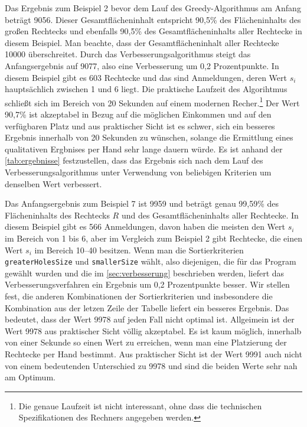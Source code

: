 Das Ergebnis zum Beispiel 2 bevor dem Lauf des Greedy-Algorithmus am Anfang 
beträgt 9056. Dieser Gesamtflächeninhalt entspricht 90,5\% des Flächeninhalts des
großen Rechtecks und ebenfalls 90,5\% des Gesamtflächeninhalts aller Rechtecke in diesem Beispiel.
Man beachte, dass der Gesamtflächeninhalt aller Rechtecke 10000 überschreitet.
Durch das Verbesserungsalgorithmus steigt das Anfangsergebnis auf 9077,
also eine Verbesserung um 0,2 Prozentpunkte.
In diesem Beispiel gibt es 603 Rechtecke und das sind Anmeldungen, deren Wert $s_i$ hauptsächlich zwischen 
1 und 6 liegt. Die praktische Laufzeit des Algorihtmus schließt sich im Bereich von 20 Sekunden
auf einem modernen Recher.\footnote{Die genaue Laufzeit ist nicht interessant, ohne dass die 
technischen Spezifikationen des Rechners angegeben werden.}
Der Wert 90,7\% ist akzeptabel in Bezug auf die möglichen Einkommen und auf den verfügbaren Platz
und aus praktischer Sicht ist es schwer, sich ein besseres Ergebnis innerhalb von 20 Sekunden zu wünschen,
solange die Ermittlung eines qualitativen Ergbnises per Hand sehr lange dauern würde.
Es ist anhand der \cref{tab:ergebnisse} festzustellen, dass das Ergebnis sich nach dem Lauf des
Verbesserungsalgorithmus unter Verwendung von beliebigen Kriterien um denselben Wert verbessert.

Das Anfangsergebnis zum Beispiel 7 ist 9959 und beträgt genau 99,59\% des Flächeninhalts
des Rechtecks $R$ und des Gesamtflächeninhalts aller Rechtecke. In diesem Beispiel
gibt es 566 Anmeldungen, davon haben die meisten den Wert $s_i$ im Bereich von 1 bis 6, aber
im Vergleich zum Beispiel 2 gibt Rechtecke, die einen Wert $s_i$ im Bereich 10--40 besitzen.
Wenn man die Sortierkriterien \texttt{greaterHolesSize} und \texttt{smallerSize} wählt,
also diejenigen, die für das Program gewählt wurden und die im \cref{sec:verbesserung} beschrieben werden,
liefert das Verbesserungsverfahren ein Ergebnis um 0,2 Prozentpunkte besser.
Wir stellen fest, die anderen Kombinationen der Sortierkriterien und insbesondere die Kombination
aus der letzen Zeile der Tabelle liefert ein besseres Ergebnis.
Das bedeutet, dass der Wert 9978 auf jeden Fall nicht optimal ist. 
Allgeimein ist der Wert 9978 aus praktischer Sicht völlig akzeptabel.
Es ist kaum möglich, innerhalb von einer Sekunde so einen Wert zu erreichen,
wenn man eine Platzierung der Rechtecke per Hand bestimmt.
Aus praktischer Sicht ist der Wert 9991 auch nicht von einem bedeutenden Unterschied zu 9978 und
sind die beiden Werte sehr nah am Optimum.

